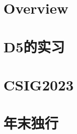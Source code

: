 \documentclass{si_template/cn_note}
\begin{document}
\frontmatter
\mainmatter

\chapter{Overview}


\chapter{D5的实习}
\chapter{CSIG2023}
\chapter{年末独行}

\backmatter
\end{document}
